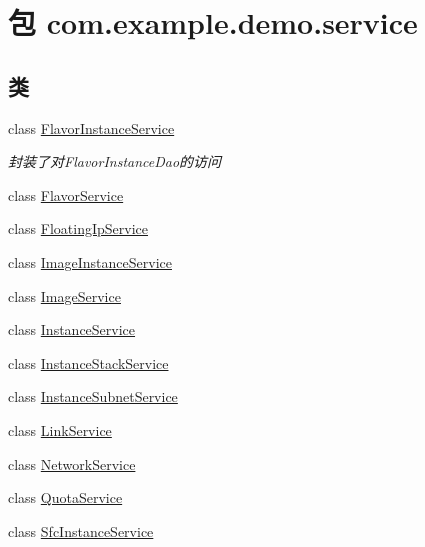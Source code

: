 \hypertarget{namespacecom_1_1example_1_1demo_1_1service}{}\section{包 com.\+example.\+demo.\+service}
\label{namespacecom_1_1example_1_1demo_1_1service}
\subsection*{类}
\begin{DoxyCompactItemize}
\item 
class \mbox{\hyperlink{classcom_1_1example_1_1demo_1_1service_1_1_flavor_instance_service}{Flavor\+Instance\+Service}}
\begin{DoxyCompactList}\small\item\em 封装了对\+Flavor\+Instance\+Dao的访问 \end{DoxyCompactList}\item 
class \mbox{\hyperlink{classcom_1_1example_1_1demo_1_1service_1_1_flavor_service}{Flavor\+Service}}
\item 
class \mbox{\hyperlink{classcom_1_1example_1_1demo_1_1service_1_1_floating_ip_service}{Floating\+Ip\+Service}}
\item 
class \mbox{\hyperlink{classcom_1_1example_1_1demo_1_1service_1_1_image_instance_service}{Image\+Instance\+Service}}
\item 
class \mbox{\hyperlink{classcom_1_1example_1_1demo_1_1service_1_1_image_service}{Image\+Service}}
\item 
class \mbox{\hyperlink{classcom_1_1example_1_1demo_1_1service_1_1_instance_service}{Instance\+Service}}
\item 
class \mbox{\hyperlink{classcom_1_1example_1_1demo_1_1service_1_1_instance_stack_service}{Instance\+Stack\+Service}}
\item 
class \mbox{\hyperlink{classcom_1_1example_1_1demo_1_1service_1_1_instance_subnet_service}{Instance\+Subnet\+Service}}
\item 
class \mbox{\hyperlink{classcom_1_1example_1_1demo_1_1service_1_1_link_service}{Link\+Service}}
\item 
class \mbox{\hyperlink{classcom_1_1example_1_1demo_1_1service_1_1_network_service}{Network\+Service}}
\item 
class \mbox{\hyperlink{classcom_1_1example_1_1demo_1_1service_1_1_quota_service}{Quota\+Service}}
\item 
class \mbox{\hyperlink{classcom_1_1example_1_1demo_1_1service_1_1_sfc_instance_service}{Sfc\+Instance\+Service}}

\end{DoxyCompactItemize}

